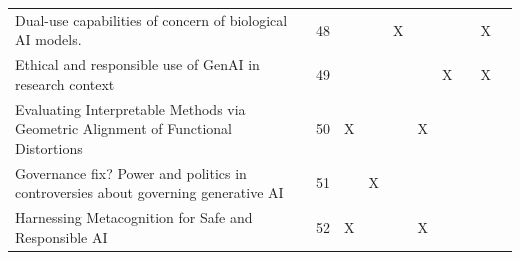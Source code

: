 \begin{landscape}
\begin{longtable}{|p{14cm}|c|c|c|c|c|c|c|c|c|}
		Dual-use capabilities of concern of biological AI models.                                                                                               & 48          &                                    &                                                           & X                                                     &                                                            &                                           &                                              & X                                                  &                                    \\
		Ethical and responsible use of GenAI in research context                                                                                                & 49          &                                    &                                                           &                                                       &                                                            & X                                         &                                              & X                                                  &                                    \\
		Evaluating Interpretable Methods via Geometric Alignment of Functional Distortions                                                                      & 50          & X                                  &                                                           &                                                       & X                                                          &                                           &                                              &                                                    &                                    \\
		Governance fix? Power and politics in controversies about governing generative AI                                                                       & 51          &                                    & X                                                         &                                                       &                                                            &                                           &                                              &                                                    &                                    \\
		Harnessing Metacognition for Safe and Responsible AI                                                                                                    & 52          & X                                  &                                                           &                                                       & X                                                          &                                           &                                              &                                                    &                                    \\

\end{longtable}
\end{landscape}
